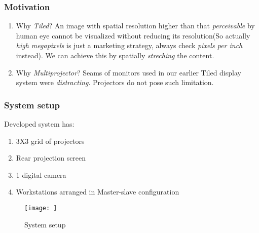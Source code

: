 \documentclass{beamer}
\begin{document}
\begin{frame}
\frametitle{Motivation}
\begin{enumerate}
\item Why \textit{Tiled}?\newline
An image with spatial resolution higher than that \textit{perceivable} by human eye cannot be visualized without reducing its resolution(So actually \textit{high megapixels} is just a marketing strategy, always check \textit{pixels per inch} instead). We can achieve this by spatially \textit{streching} the content.
\item Why \textit{Multiprojector}?\newline
Seams of monitors used in our earlier Tiled display system were \textit{distracting}. Projectors do not pose such limitation.
\end{enumerate}
\end{frame}

\begin{frame}
\frametitle{System setup}
Developed system has:
\begin{enumerate}
\item 3X3 grid of projectors
\item Rear projection screen
\item 1 digital camera
\item Workstations arranged in Master-slave configuration
\end{enumerate}
\begin{figure}
\texttt{[image: ]}
\caption{System setup}
\end{figure}
\end{frame}
\end{document}
